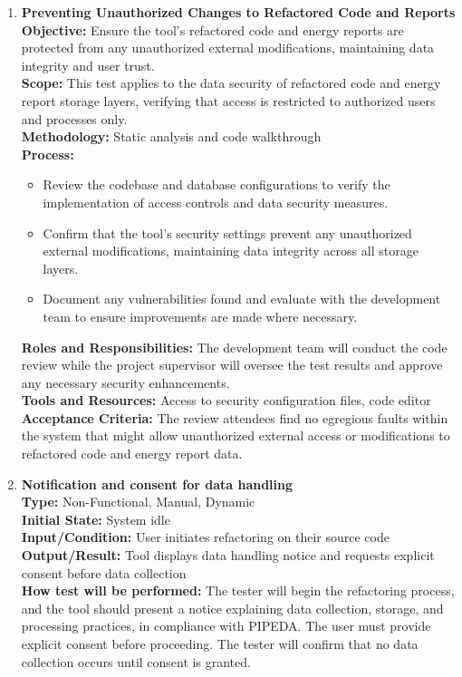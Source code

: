 \documentclass[12pt, titlepage]{article}
\begin{document}
\begin{enumerate}[label={\bf \textcolor{Maroon}{test-SRT-\arabic*}}, wide=0pt, font=\itshape]
    \item \textbf{Preventing Unauthorized Changes to Refactored Code and Reports} \\[2mm]
    \textbf{Objective:} Ensure the tool’s refactored code and energy reports are protected from any unauthorized external modifications, maintaining data integrity and user trust. \\[2mm]
    \textbf{Scope:} This test applies to the data security of refactored code and energy report storage layers, verifying that access is restricted to authorized users and processes only. \\[2mm]
    \textbf{Methodology:} Static analysis and code walkthrough \\[2mm]
    \textbf{Process:}
    \begin{itemize}
      \item Review the codebase and database configurations to verify the implementation of access controls and data security measures.
      \item Confirm that the tool’s security settings prevent any unauthorized external modifications, maintaining data integrity across all storage layers.
      \item Document any vulnerabilities found and evaluate with the development team to ensure improvements are made where necessary.
    \end{itemize}
    \textbf{Roles and Responsibilities:} The development team will conduct the code review while the project supervisor will oversee the test results and approve any necessary security enhancements. \\[2mm]
    \textbf{Tools and Resources:} Access to security configuration files, code editor \\[2mm]
    \textbf{Acceptance Criteria:} The review attendees find no egregious faults within the system that might allow unauthorized external access or modifications to refactored code and energy report data.

  \item \textbf{Notification and consent for data handling} \\[2mm]
    \textbf{Type:} Non-Functional, Manual, Dynamic \\ 
    \textbf{Initial State:} System idle \\
    \textbf{Input/Condition:} User initiates refactoring on their source code \\
    \textbf{Output/Result:} Tool displays data handling notice and requests explicit consent before data collection \\[2mm]
    \textbf{How test will be performed:} The tester will begin the refactoring process, and the tool should present a notice explaining data collection, storage, and processing practices, in compliance with PIPEDA. The user must provide explicit consent before proceeding. The tester will confirm that no data collection occurs until consent is granted.
  

\end{enumerate}
\end{document}
